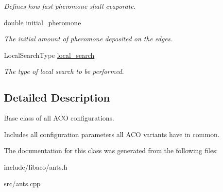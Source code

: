\begin{CompactItemize}
\begin{CompactList}\small\item\em Defines how fast pheromone shall evaporate. \item\end{CompactList}\item 
\hypertarget{classAntColonyConfiguration_3ff4ef23212123411b37c43aa2a7f8e1}{
double \hyperlink{classAntColonyConfiguration_3ff4ef23212123411b37c43aa2a7f8e1}{initial\_\-pheromone}}
\label{classAntColonyConfiguration_3ff4ef23212123411b37c43aa2a7f8e1}

\begin{CompactList}\small\item\em The initial amount of pheromone deposited on the edges. \item\end{CompactList}\item 
\hypertarget{classAntColonyConfiguration_b8eb9dd710a57a0f8c6f40d5ff82dcc0}{
LocalSearchType \hyperlink{classAntColonyConfiguration_b8eb9dd710a57a0f8c6f40d5ff82dcc0}{local\_\-search}}
\label{classAntColonyConfiguration_b8eb9dd710a57a0f8c6f40d5ff82dcc0}

\begin{CompactList}\small\item\em The type of local search to be performed. \item\end{CompactList}\end{CompactItemize}


\subsection{Detailed Description}
Base class of all ACO configurations. 

Includes all configuration parameters all ACO variants have in common. 

The documentation for this class was generated from the following files:\begin{CompactItemize}
\item 
include/libaco/ants.h\item 
src/ants.cpp\end{CompactItemize}
